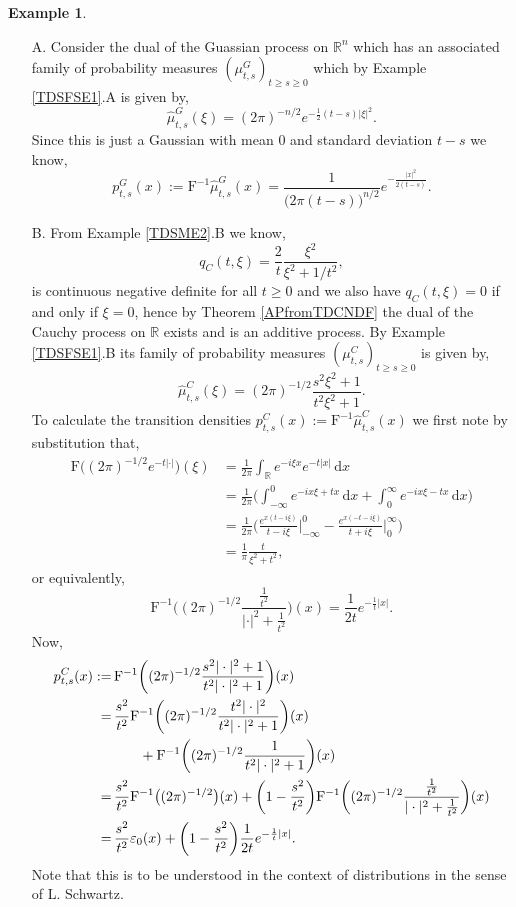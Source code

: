 \documentclass[a4paper, 12pt]{report}
\theoremstyle{remark}
\theoremstyle{definition}
\newtheorem{example}[theorem]{Example}
\begin{document}
\begin{example}
\hspace{0.5cm}
\begin{itemize}
\item[A.] Consider the dual of the Guassian process on $\mathbb{R}^n$ which has an associated family of probability measures $(\mu_{t, s}^G)_{t \ge s \ge 0}$ which by Example \ref{TDSFSE1}.A is given by,
$$
\hat{\mu}_{t, s}^G(\xi) = (2\pi)^{-n/2}e^{-\frac{1}{2}(t - s)|\xi|^2}.
$$
Since this is just a Gaussian with mean $0$ and standard deviation $t - s$ we know,
$$
p_{t, s}^G(x) := \mathrm{F}^{-1}\hat{\mu}_{t, s}^G(x) = \frac{1}{\big(2\pi(t - s)\big)^{n/2}}e^{-\frac{|x|^2}{2(t - s)}}.
$$

\item[B.] From Example \ref{TDSME2}.B we know,
$$
q_C(t, \xi) = \frac{2}{t}\frac{\xi^2}{\xi^2 + 1/t^2},
$$
is continuous negative definite for all $t \ge 0$ and we also have $q_C(t, \xi) = 0$ if and only if $\xi = 0$, hence by Theorem \ref{APfromTDCNDF} the dual of the Cauchy process on $\mathbb{R}$ exists and is an additive process.  By Example \ref{TDSFSE1}.B its family of probability measures $(\mu_{t, s}^C)_{t \ge s \ge 0}$ is given by,
$$
\hat{\mu}_{t, s}^C(\xi) = (2\pi)^{-1/2}\frac{s^2\xi^2 + 1}{t^2\xi^2 + 1}.
$$
To calculate the transition densities $p_{t, s}^C(x) := \mathrm{F}^{-1}\hat{\mu}_{t, s}^C(x)$ we first note by substitution that,
$$
\begin{aligned}
\mathrm{F}\big((2\pi)^{-1/2}e^{-t|\cdot|}\big)(\xi) & = \frac{1}{2\pi}\int_{\mathbb{R}}e^{-i\xi x}e^{-t|x|}\,\mathrm{d}x\\
& = \frac{1}{2\pi}\bigg(\int_{-\infty}^0 e^{-ix\xi + tx}\,\mathrm{d}x + \int_0^\infty e^{-ix\xi - tx}\,\mathrm{d}x\bigg)\\
& = \frac{1}{2\pi}\bigg(\frac{e^{x(t - i\xi)}}{t - i\xi}\bigg|_{-\infty}^0 - \frac{e^{x(-t - i\xi)}}{t + i\xi}\bigg|_0^\infty\bigg)\\
& = \frac{1}{\pi}\frac{t}{\xi^2 + t^2},
\end{aligned}
$$
or equivalently,
$$
\mathrm{F}^{-1}\bigg((2\pi)^{-1/2}\frac{\frac{1}{t^2}}{|\cdot|^2 + \frac{1}{t^2}}\bigg)(x) = \frac{1}{2t}e^{-\frac{1}{t}|x|}.
$$
Now,
$$
\begin{aligned}
p_{t, s}^C(x) := & \, \mathrm{F}^{-1}\bigg((2\pi)^{-1/2}\frac{s^2|\cdot|^2 + 1}{t^2|\cdot|^2 + 1}\bigg)(x)\\
= & \, \frac{s^2}{t^2}\mathrm{F}^{-1}\bigg((2\pi)^{-1/2}\frac{t^2|\cdot|^2}{t^2|\cdot|^2 + 1}\bigg)(x)\\
& \hspace{0.7cm} + \mathrm{F}^{-1}\bigg((2\pi)^{-1/2}\frac{1}{t^2|\cdot|^2 + 1}\bigg)(x)\\
= & \, \frac{s^2}{t^2}\mathrm{F}^{-1}\big((2\pi)^{-1/2}\big)(x) + \bigg(1 - \frac{s^2}{t^2}\bigg)\mathrm{F}^{-1}\bigg((2\pi)^{-1/2}\frac{\frac{1}{t^2}}{|\cdot|^2 + \frac{1}{t^2}}\bigg)(x)\\
= & \, \frac{s^2}{t^2}\varepsilon_0(x) + \bigg(1 - \frac{s^2}{t^2}\bigg)\frac{1}{2t}e^{-\frac{1}{t}|x|}.
\end{aligned}
$$
Note that this is to be understood in the context of distributions in the sense of L. Schwartz.


\end{itemize}
\end{example}
\end{document}
